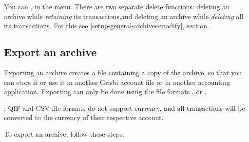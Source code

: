 You can , in the  menu. There are two separate delete functions: deleting an archive while \emph{retaining} its transactions,and deleting an archive while \emph{deleting} all its transactions. For this see \vref{setup-general-archives-modify},  section. 

\subsection{Export an archive\label{datamanagement-archive-export}}

Exporting an archive creates a file containing a copy of the archive, so that you can store it or use it in another Grisbi account file or in another accounting application. Exporting can only be done using the file formats ,  or .

\Attention{}: QIF and CSV file formats do not support currency, and all transactions will be converted to the currency of their respective account.

To export an archive, follow these steps:

